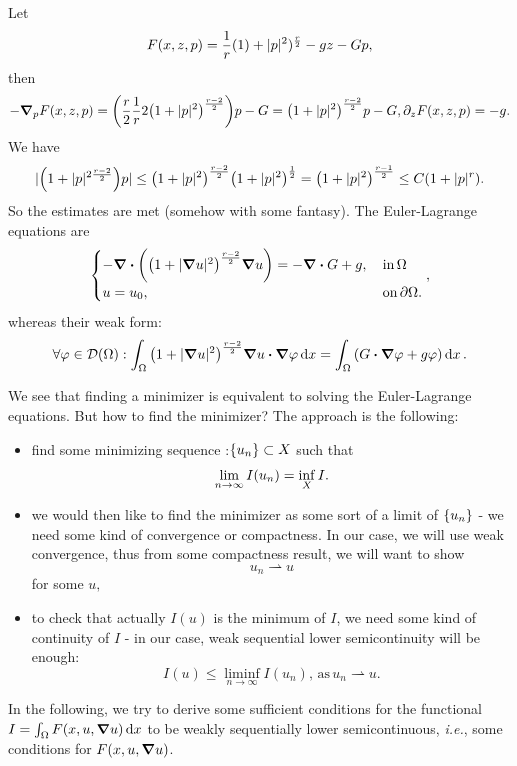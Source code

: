 \documentclass{article}
\begin{document}
\begin{example}
	Let
	\[
		F\qty(x,z,p) = \frac{1}{r}\qty(1)+|p|^{2})^{\frac{r}{2}} - gz - Gp,
	\]
	then
	\[
		- \grad_p F\qty(x,z,p) = \qty(\frac{r}{2}\frac{1}{r} 2 \qty(1+|p|^{2})^{\frac{r-2}{2}})p -G = \qty(1+|p|^{2})^{\frac{r-2}{2}}p-G, \partial_{z}F\qty(x,z,p) = -g.
	\]
	We have
	\[
		|\qty(1+|p|^{2\frac{r-2}{2}})p| \leq \qty(1+|p|^{2})^{\frac{r-2}{2}}\qty(1+|p|^{2})^{\frac{1}{2}} = \qty(1+|p|^{2})^{\frac{r-1}{2}}\leq C\qty(1+|p|^r).
	\]
	So the estimates are met (somehow with some fantasy).
	The Euler-Lagrange equations are
	\[
		\begin{cases}
			- \divergence{\qty(\qty(1+|\grad u|^{2})^{\frac{r-2}{2}}\grad u)} = - \divergence{G} + g, & \, \text{in} \, \Omega\\
			u = u_0, & \, \text{on} \, \partial \Omega.
		\end{cases},
	\]
	whereas their weak form:
	\[
		\forall \varphi \in \mathcal{D}\qty(\Omega):\int_{\Omega}\qty(1+|\grad u|^{2})^{\frac{r-2}{2}}\grad u \vdot \grad \varphi\dd{x} = \int_{\Omega}\qty(G \vdot \grad\varphi + g \varphi) \dd{x}.
	\]
\end{example}
We see that finding a minimizer is equivalent to solving the Euler-Lagrange equations. But how to find the minimizer? The approach is the following:
\begin{remark}


	\begin{itemize}
		\item find some minimizing sequence :$ \qty{u_n} \subset X$ such that
			\[
				\lim_{n \to \infty}I\qty(u_n) = \inf_X I.
			\]
		\item we would then like to find the minimizer as some sort of a limit of $\qty{u_n}$ - we need some kind of convergence or compactness. In our case, we will use weak convergence, thus from some compactness result, we will want to show
			\[
				u_n \rightharpoonup u
			\]
			for some $u,$
		\item to check that actually $I(u)$ is the minimum of $I$, we need some kind of continuity of $I$ - in our case, weak sequential lower semicontinuity will be enough:
			\[
				I(u) \leq \liminf_{n \to \infty} I(u_n), \, \text{as} \, u_n \rightharpoonup u.
			\]
	\end{itemize}
\end{remark}

In the following, we try to derive some sufficient conditions for the functional $I = \int_{\Omega}F\qty(x, u, \grad u)\dd{x}$ to be weakly sequentially lower semicontinuous, \textit{i.e.}, some conditions for $F\qty(x, u, \grad u)$. 
\end{document}
